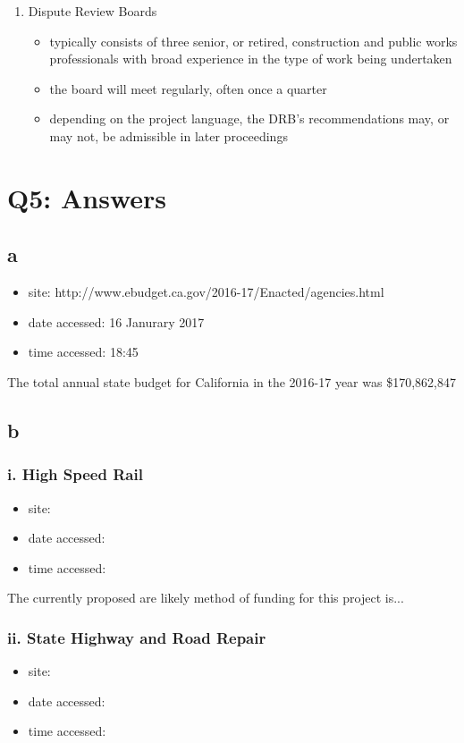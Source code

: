 \documentclass[12pt]{article} %
\begin{document}
\begin{enumerate}
\begin{itemize}
					\end{itemize}
				\item Dispute Review Boards
					\begin{itemize}
						\item typically consists of three senior, or retired, construction and public works professionals with broad experience in the type of work being undertaken
						\item the board will meet regularly, often once a quarter
						\item depending on the project language, the DRB's recommendations may, or may not, be admissible in later proceedings
					\end{itemize}
			\end{enumerate}


\section{Q5: Answers}

	\subsection{a}
		\begin{itemize}
			\item site: http://www.ebudget.ca.gov/2016-17/Enacted/agencies.html 
			\item date accessed: 16 Janurary 2017
			\item time accessed: 18:45 
		\end{itemize}
		The total annual state budget for California in the 2016-17 year was \$170,862,847
	\subsection{b}
	
		\subsubsection{i. High Speed Rail}
			\begin{itemize}
				\item site: 
				\item date accessed: 
				\item time accessed: 
			\end{itemize}
		
			The currently proposed are likely method of funding for this project is...
			
		\subsubsection{ii. State Highway and Road Repair}
			\begin{itemize}
				\item site: 
				\item date accessed: 
				\item time accessed: 
			\end{itemize}
		
\end{document}
